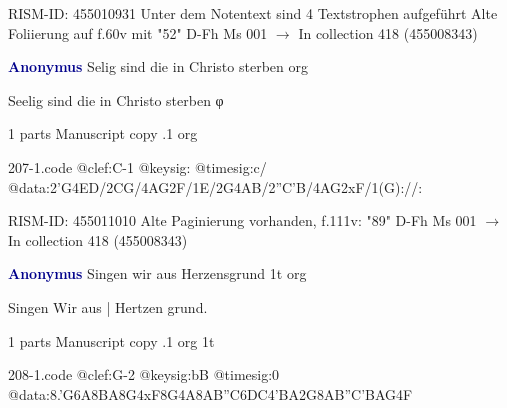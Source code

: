 \documentclass[twocolumn]{book}
\begin{document}
\newline RISM-ID: 455010931
\newline Unter dem Notentext sind 4 Textstrophen aufgeführt
\newline Alte Foliierung auf f.60v mit "52"
\newline D-Fh  Ms 001
\newline $\rightarrow$ In collection 418 (455008343)

\newline \par \vspace{7pt} \textcolor{darkblue}{\textbf{Anonymus  }}
\newline Selig sind die in Christo sterben    
\newline org
\newline \begin{itshape} Seelig sind die in Christo sterben φ\end{itshape} 
\newline \textcolor{darkblue}{}  1 parts  
\newline Manuscript copy
.1  org  
\begin{filecontents*}{207-1.code}
@clef:C-1
@keysig:
@timesig:c/
@data:2'G4ED/2CG/4AG2F/1E/2G4AB/2''C'B/4AG2xF/1(G)://:
\end{filecontents*}
\newline
%

\newline RISM-ID: 455011010
\newline Alte Paginierung vorhanden, f.111v: "89"
\newline D-Fh  Ms 001
\newline $\rightarrow$ In collection 418 (455008343)

\newline \par \vspace{7pt} \textcolor{darkblue}{\textbf{Anonymus  }}
\newline Singen wir aus Herzensgrund  1t  
\newline org
\newline \begin{itshape}[f.53v, at left:] Singen Wir aus | Hertzen grund.\end{itshape} 
\newline \textcolor{darkblue}{}  1 parts  
\newline Manuscript copy
.1  org  1t  
\begin{filecontents*}{208-1.code}
@clef:G-2
@keysig:bB
@timesig:0
@data:8.'G6A{8BA}8G4xF8G4A{8AB''C6DC}4'BA2G{8AB''C'B}{AG}4F
\end{filecontents*}
\newline
%
\end{document}
